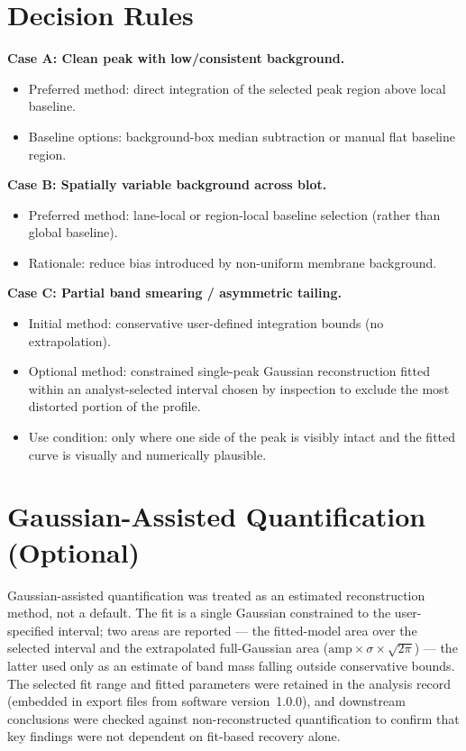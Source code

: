 \section{Decision Rules}

\textbf{Case A: Clean peak with low/consistent background.}
\begin{itemize}
    \item Preferred method: direct integration of the selected peak region above local baseline.
    \item Baseline options: background-box median subtraction or manual flat baseline region.
\end{itemize}

\textbf{Case B: Spatially variable background across blot.}
\begin{itemize}
    \item Preferred method: lane-local or region-local baseline selection (rather than global baseline).
    \item Rationale: reduce bias introduced by non-uniform membrane background.
\end{itemize}

\textbf{Case C: Partial band smearing / asymmetric tailing.}
\begin{itemize}
    \item Initial method: conservative user-defined integration bounds (no extrapolation).
    \item Optional method: constrained single-peak Gaussian reconstruction fitted within an analyst-selected interval chosen by inspection to exclude the most distorted portion of the profile.
    \item Use condition: only where one side of the peak is visibly intact and the fitted curve is visually and numerically plausible.
\end{itemize}

\section{Gaussian-Assisted Quantification (Optional)}

Gaussian-assisted quantification was treated as an estimated reconstruction method, not a default. The fit is a single Gaussian constrained to the user-specified interval; two areas are reported --- the fitted-model area over the selected interval and the extrapolated full-Gaussian area ($\mathrm{amp}\times\sigma\times\sqrt{2\pi}$) --- the latter used only as an estimate of band mass falling outside conservative bounds. The selected fit range and fitted parameters were retained in the analysis record (embedded in export files from software version~1.0.0), and downstream conclusions were checked against non-reconstructed quantification to confirm that key findings were not dependent on fit-based recovery alone.

